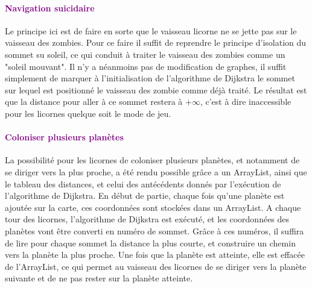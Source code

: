 \documentclass{report}
\begin{document}
			\paragraph{\textcolor{purple}{Navigation suicidaire}}
			Le principe ici est de faire en sorte que le vaisseau licorne ne se jette pas sur le vaisseau des zombies.
			Pour ce faire il suffit de reprendre le principe d'isolation du sommet su soleil, ce qui conduit à traiter le vaisseau des zombies comme un "soleil mouvant". Il n'y a néanmoins pas de modification de graphes, il suffit simplement de marquer à l'initialisation de l'algorithme de Dijkstra le sommet sur lequel est positionné le vaisseau des zombie comme déjà traité. Le résultat est que la distance pour aller à ce sommet restera à $+\infty$, c'est à dire inaccessible pour les licornes quelque soit le mode de jeu.
			\paragraph{\textcolor{purple}{Coloniser plusieurs planètes}}
			La possibilité pour les licornes de coloniser plusieurs planètes, et notamment de se diriger vers la plus proche, a été rendu possible grâce a un ArrayList, ainsi que le tableau des distances, et celui des antécédents donnés par l'exécution de l'algorithme de Dijkstra.
			En début de partie, chaque fois qu'une planète est ajoutée sur la carte, ces coordonnées sont stockées dans un ArrayList. A chaque tour des licornes, l'algorithme de Dijkstra est exécuté, et les coordonnées des planètes vont être converti en numéro de sommet. Grâce à ces numéros, il suffira de lire pour chaque sommet la distance la plus courte, et construire un chemin vers la planète la plus proche.
			Une fois que la planète est atteinte, elle est effacée de l'ArrayList, ce qui permet au vaisseau des licornes de se diriger vers la planète suivante et de ne pas rester sur la planète atteinte.
\end{document}
